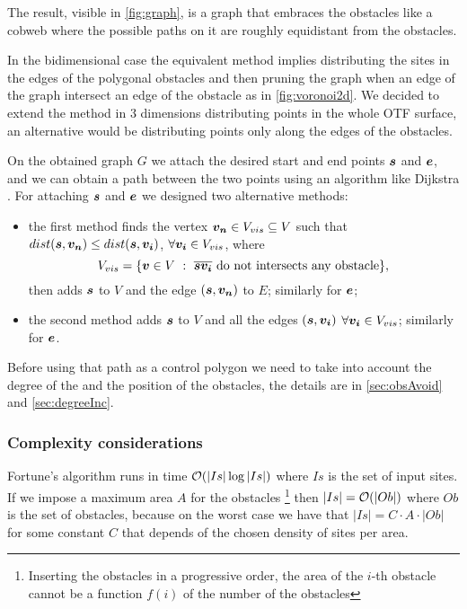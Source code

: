 \documentclass[dissertation.tex]{subfiles}
\begin{document}
The result, visible in \cref{fig:graph}, is a graph that embraces the
obstacles like a cobweb where the possible paths on it are roughly
equidistant from the obstacles.

In the bidimensional case the equivalent method implies distributing
the sites in the edges of the polygonal obstacles and then pruning the
graph when an edge of the graph intersect an edge of the obstacle as
in \cref{fig:voronoi2d}.
We decided to extend the method in 3 dimensions distributing points in
the whole \ac{OTF} surface, an alternative would be distributing
points only along the edges of the obstacles.

On the obtained graph $G$ we attach the desired start and end
points $\boldsymbol{s}$ and $\boldsymbol{e}$, and we can obtain a path between the two points using an
algorithm like Dijkstra \cite{dijkstra}\cite{knuth}. For attaching $\boldsymbol{s}$
and $\boldsymbol{e}$ we designed two
alternative methods:
\begin{itemize}
\item the first method finds the vertex $\boldsymbol{v_n}\in V_{vis}\subseteq V$ such
  that $dist(\boldsymbol{s},\boldsymbol{v_n})\leq dist(\boldsymbol{s},\boldsymbol{v_i})$, $\forall
  \boldsymbol{v_i}\in V_{vis}$, where
  \begin{equation*}
    V_{vis}=\{\boldsymbol{v}\in V\ :\ \overline{\boldsymbol{s} \boldsymbol{v_i}}\ \text{do not
      intersects any obstacle}\},
  \end{equation*}
  then adds $\boldsymbol{s}$ to $V$ and the edge $(\boldsymbol{s},\boldsymbol{v_n})$ to $E$;
  similarly for $\boldsymbol{e}$;
\item the second method adds $\boldsymbol{s}$ to $V$ and all the edges $(\boldsymbol{s},\boldsymbol{v_i})$
  $\forall \boldsymbol{v_i}\in V_{vis}$; similarly for $\boldsymbol{e}$.
\end{itemize}

Before using that path as a control polygon
we need to take into account the degree of the \bs and the
position of the obstacles, the details are in \cref{sec:obsAvoid} and
\cref{sec:degreeInc}.

\subsubsection{Complexity considerations}
Fortune's algorithm runs in time $\mathcal{O}(|Is|\log |Is|)$ \cite{deberg}
where $Is$ is
the set 
of input sites. If we impose a maximum area $A$ for the obstacles
\footnote{Inserting the obstacles in a progressive order, the area of the $i$-th
obstacle cannot be a function $f(i)$ of the number of
the obstacles} then $|Is|=\mathcal{O}(|Ob|)$ where $Ob$ is the set of
obstacles, because on the worst case we have that $|Is|=C\cdot A\cdot
|Ob|$ for
some constant $C$ that depends of the chosen density of sites per area.
\end{document}
